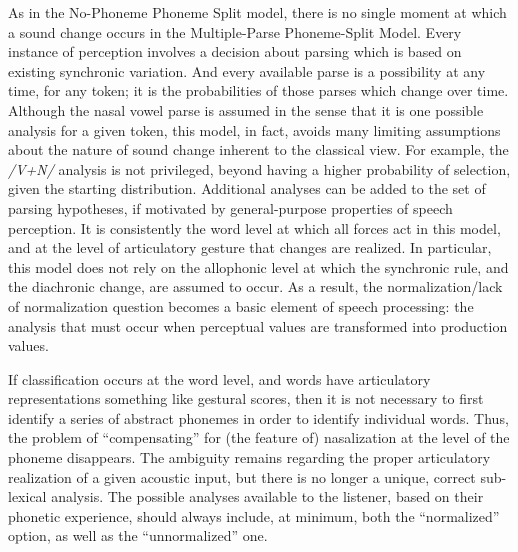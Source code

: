 As in the No-Phoneme Phoneme Split model, there is no single moment
at which a sound change occurs in the Multiple-Parse Phoneme-Split
Model. Every instance of perception involves a decision about parsing
which is based on existing synchronic variation. And every available
parse is a possibility at any time, for any token; it is the probabilities
of those parses which change over time. Although the nasal vowel parse
is assumed in the sense that it is one possible analysis for a given
token, this model, in fact, avoids many limiting assumptions about
the nature of sound change inherent to the classical view. For example,
the \emph{/V+N/} analysis is not privileged, beyond having a higher
probability of selection, given the starting distribution. Additional
analyses can be added to the set of parsing hypotheses, if motivated
by general-purpose properties of speech perception. It is consistently
the word level at which all forces act in this model, and at the level
of articulatory gesture that changes are realized. In particular,
this model does not rely on the allophonic level at which the synchronic
rule, and the diachronic change, are assumed to occur. As a result,
the normalization/lack of normalization question becomes a basic element
of speech processing: the analysis that must occur when perceptual
values are transformed into production values. 

If classification occurs at the word level, and words have articulatory
representations something like gestural scores, then it is not necessary
to first identify a series of abstract phonemes in order to identify
individual words. Thus, the problem of “compensating” for (the
feature of) nasalization at the level of the phoneme disappears. The
ambiguity remains regarding the proper articulatory realization of
a given acoustic input, but there is no longer a unique, correct sub-lexical
analysis. The possible analyses available to the listener, based on
their phonetic experience, should always include, at minimum, both
the “normalized” option, as well as the “unnormalized”
one.

